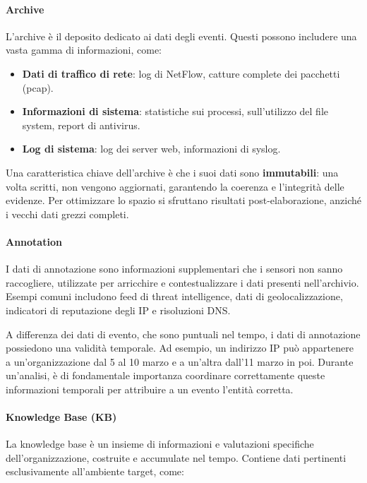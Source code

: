 \paragraph{Archive}

L'archive è il deposito dedicato ai dati degli eventi.
Questi possono includere una vasta gamma di informazioni, come:

\begin{itemize}
\item \textbf{Dati di traffico di rete}: log di NetFlow, catture complete dei pacchetti (pcap).
\item \textbf{Informazioni di sistema}: statistiche sui processi, sull'utilizzo del file system,
report di antivirus.
\item \textbf{Log di sistema}: log dei server web, informazioni di syslog.
\end{itemize}

Una caratteristica chiave dell'archive è che i suoi dati sono \textbf{immutabili}:
una volta scritti, non vengono aggiornati, garantendo la coerenza e l'integrità delle evidenze.
Per ottimizzare lo spazio si sfruttano risultati post-elaborazione, anziché i vecchi dati grezzi completi.

\paragraph{Annotation}

I dati di annotazione sono informazioni supplementari che i sensori non sanno raccogliere, 
utilizzate per arricchire e contestualizzare i dati presenti nell'archivio.
Esempi comuni includono feed di threat intelligence, dati di geolocalizzazione,
indicatori di reputazione degli IP e risoluzioni DNS.

A differenza dei dati di evento, che sono puntuali nel tempo, i dati di annotazione
possiedono una validità temporale.
Ad esempio, un indirizzo IP può appartenere a un'organizzazione dal 5 al 10 marzo
e a un'altra dall'11 marzo in poi.
Durante un'analisi, è di fondamentale importanza coordinare correttamente
queste informazioni temporali per attribuire a un evento l'entità corretta.

\paragraph{Knowledge Base (KB)}

La knowledge base è un insieme di informazioni e valutazioni specifiche
dell'organizzazione, costruite e accumulate nel tempo.
Contiene dati pertinenti esclusivamente all'ambiente target, come:

